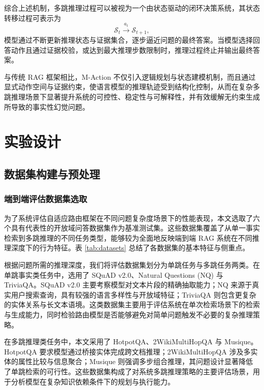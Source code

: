 综合上述机制，多跳推理过程可以被视为一个由状态驱动的闭环决策系统，其状态转移过程可表示为
\begin{equation}
\mathcal{S}_t \xrightarrow{a_t} \mathcal{S}_{t+1},
\end{equation}
模型通过不断更新推理状态与证据集合，逐步逼近问题的最终答案。当模型选择回答动作且通过证据校验，或达到最大推理步数限制时，推理过程终止并输出最终答案。

与传统 RAG 框架相比，M-Action 不仅引入逻辑规划与状态建模机制，而且通过显式动作空间与证据约束，使语言模型的推理轨迹受到结构化控制，从而在复杂多跳推理场景下显著提升系统的可控性、稳定性与可解释性，并有效缓解无约束生成所导致的事实性幻觉问题。

\section{实验设计}\label{ch03:exp}

\subsection{数据集构建与预处理}
\label{sec:dataset_construction}

\subsubsection{端到端评估数据集选取}

为了系统评估自适应路由框架在不同问题复杂度场景下的性能表现，本文选取了六个具有代表性的开放域问答数据集作为基准测试集。这些数据集覆盖了从单一事实检索到多跳推理的不同任务类型，能够较为全面地反映端到端 RAG 系统在不同推理深度下的行为特征。表 \ref{tab:datasets} 总结了各数据集的基本特征与侧重点。

根据问题所需的推理深度，我们将评估数据集划分为单跳任务与多跳任务两类。在单跳事实类任务中，选用了 SQuAD v2.0、Natural Questions (NQ) 与 TriviaQA。SQuAD v2.0 主要考察模型对文本片段的精确抽取能力；NQ 来源于真实用户搜索查询，具有较强的语言多样性与开放域特征；TriviaQA 则包含更复杂的实体关系与长文本语境。这类数据集主要用于评估系统在单次检索场景下的检索与生成能力，同时检验路由模型是否能够避免对简单问题触发不必要的复杂推理策略。

在多跳推理类任务中，本文采用了 HotpotQA、2WikiMultiHopQA 与 Musique。HotpotQA 要求模型通过桥接实体完成跨文档推理；2WikiMultiHopQA 涉及多实体的属性比较与信息聚合；Musique 则强调多步组合推理，其问题设计显著降低了单跳检索的可行性。这些数据集构成了对系统多跳推理策略的主要评估场景，用于分析模型在复杂知识依赖条件下的规划与执行能力。

